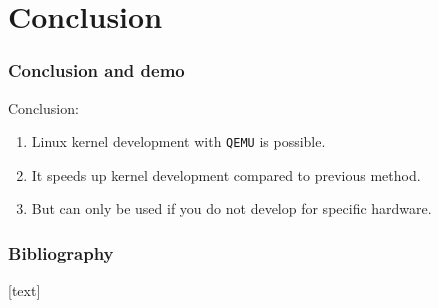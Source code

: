 \documentclass[table, trans, aspectratio = 169]{beamer}
\newcommand{\cmark}{\ding{51}}%
\newcommand{\xmark}{\ding{55}}%
\begin{document}
	\section{Conclusion}
	\begin{frame}
		\frametitle{Conclusion and demo}

		Conclusion:
		\begin{enumerate}
			\item[\cmark] Linux kernel development with \texttt{QEMU} is possible.
			\item[\cmark] It speeds up kernel development compared to previous method.
			\item[\xmark] But can only be used if you do not develop for specific hardware.
		\end{enumerate}

		\bigskip

	\end{frame}

	\begin{frame}
		\frametitle{Bibliography}

		\begin{scriptsize}
			
			
		\end{scriptsize}
	\end{frame}
\end{document}
